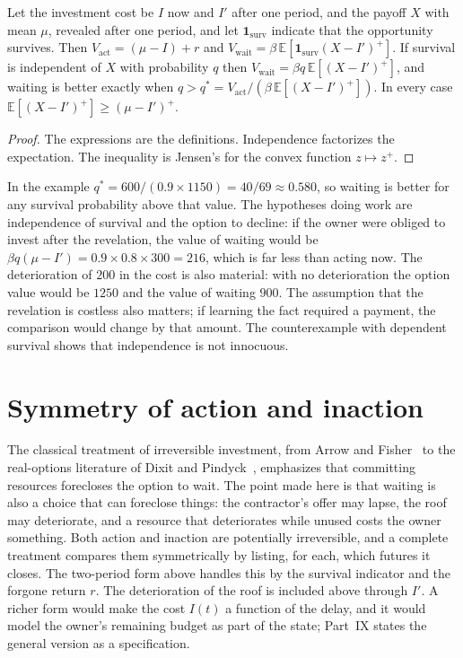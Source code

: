 \begin{proposition}\label{prop:P26}
Let the investment cost be $I$ now and $I'$ after one period, and the payoff $X$ with mean $\mu$, revealed after one period, and let $\mathbf 1_{\mathrm{surv}}$ indicate that the opportunity survives. Then $V_{\mathrm{act}}=(\mu-I)+r$ and $V_{\mathrm{wait}}=\beta\,\mathbb E[\mathbf 1_{\mathrm{surv}}(X-I')^+]$. If survival is independent of $X$ with probability $q$ then $V_{\mathrm{wait}}=\beta q\,\mathbb E[(X-I')^+]$, and waiting is better exactly when $q>q^*=V_{\mathrm{act}}/(\beta\,\mathbb E[(X-I')^+])$. In every case $\mathbb E[(X-I')^+]\ge(\mu-I')^+$.
\end{proposition}

\begin{proof}
The expressions are the definitions. Independence factorizes the expectation. The inequality is Jensen's for the convex function $z\mapsto z^+$.
\end{proof}

In the example $q^*=600/(0.9\times 1150)=40/69\approx 0.580$, so waiting is better for any survival probability above that value. The hypotheses doing work are independence of survival and the option to decline: if the owner were obliged to invest after the revelation, the value of waiting would be $\beta q(\mu-I')=0.9\times 0.8\times 300=216$, which is far less than acting now. The deterioration of $200$ in the cost is also material: with no deterioration the option value would be $1250$ and the value of waiting $900$. The assumption that the revelation is costless also matters; if learning the fact required a payment, the comparison would change by that amount. The counterexample with dependent survival shows that independence is not innocuous.

\section{Symmetry of action and inaction}

The classical treatment of irreversible investment, from Arrow and Fisher~\cite{arrow1974} to the real-options literature of Dixit and Pindyck~\cite{dixit1994}, emphasizes that committing resources forecloses the option to wait. The point made here is that waiting is also a choice that can foreclose things: the contractor's offer may lapse, the roof may deteriorate, and a resource that deteriorates while unused costs the owner something. Both action and inaction are potentially irreversible, and a complete treatment compares them symmetrically by listing, for each, which futures it closes. The two-period form above handles this by the survival indicator and the forgone return $r$. The deterioration of the roof is included above through $I'$. A richer form would make the cost $I(t)$ a function of the delay, and it would model the owner's remaining budget as part of the state; Part~IX states the general version as a specification.

